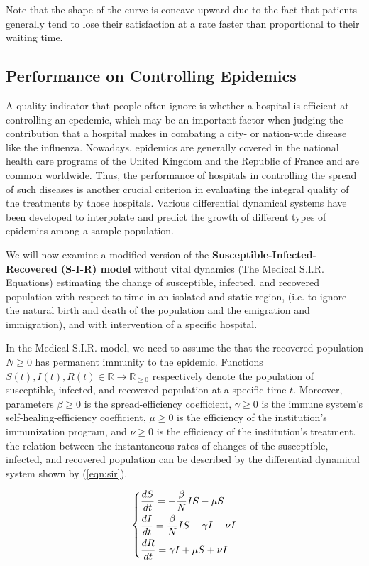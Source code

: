 \documentclass{article}
\begin{document}
Note that the shape of the curve is concave upward due to the fact that patients generally tend to lose their satisfaction at a rate faster than proportional to their waiting time.

\subsection{Performance on Controlling Epidemics}

A quality indicator that people often ignore is whether a hospital is efficient at controlling an epedemic, which may be an important factor when judging the contribution that a hospital makes in combating a city- or nation-wide disease like the influenza. Nowadays, epidemics are generally covered in the national health care programs of the United Kingdom and the Republic of France and are common worldwide. Thus, the performance of hospitals in controlling the spread of such diseases is another crucial criterion in evaluating the integral quality of the treatments by those hospitals. Various differential dynamical systems have been developed to interpolate and predict the growth of different types of epidemics among a sample population.

We will now examine a modified version of the \textbf{Susceptible-Infected-Recovered (S-I-R) model} without vital dynamics (The Medical S.I.R. Equations) estimating the change of susceptible, infected, and recovered population with respect to time in an isolated and static region, (i.e. to ignore the natural birth and death of the population and the emigration and immigration), and with intervention of a specific hospital.

In the Medical S.I.R. model, we need to assume the that the recovered population $N \ge 0$ has permanent immunity to the epidemic. Functions $S(t),I(t),R(t)\in\mathbb{R}\to\mathbb{R}_{\geq0}$ respectively denote the population of susceptible, infected, and recovered population at a specific time $t$. Moreover, parameters $\beta\geq0$ is the spread-efficiency coefficient, $\gamma\geq0$ is the immune system's self-healing-efficiency coefficient, $\mu\geq0$ is the efficiency of the institution's immunization program, and $\nu\geq0$ is the efficiency of the institution's treatment. the relation between the instantaneous rates of changes of the susceptible, infected, and recovered population can be described by the differential dynamical system shown by (\ref{eqn:sir}).

\begin{gather}
\label{eqn:sir}
\begin{dcases}
\frac{dS}{dt}=-\frac{\beta}{N}IS-\mu S\\
\frac{dI}{dt}=\frac{\beta}{N}IS-\gamma I-\nu I\\
\frac{dR}{dt}=\gamma I+\mu S+\nu I
\end{dcases}
\end{gather}
\end{document}
